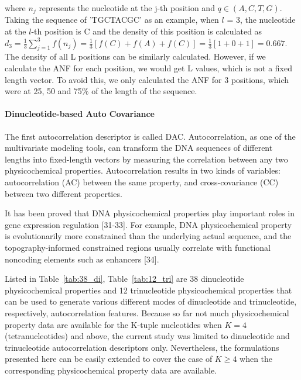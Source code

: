 where $n_{j}$ represents the nucleotide at the j-th position and $q \in (A,C,T,G)$. Taking the sequence of 'TGCTACGC' as an example, when $l$ = 3, the nucleotide at the $l$-th position is C and the density of this position is calculated as $d_{3} = \frac{1}{3}\sum_{j=1}^{3}f(n_{j}) = \frac{1}{3} [f(C) + f(A) + f(C)] = \frac{1}{3} [1+0+1] = 0.667$. The density of all L positions can be similarly calculated. However, if we calculate the ANF for each position, we would get L values, which is not a fixed length vector. To avoid this, we only calculated the ANF for 3 positions, which were at 25, 50 and 75\% of the length of the sequence.

\paragraph{Dinucleotide-based Auto Covariance}

The first autocorrelation descriptor is called \gls{DAC}. Autocorrelation, as one of the multivariate modeling tools, can transform the DNA sequences of different lengths into fixed-length vectors by measuring the correlation between any two physicochemical properties. Autocorrelation results in two kinds of variables: autocorrelation (AC) between the same property, and cross-covariance (CC) between two different properties.

It has been proved that DNA physicochemical properties play important roles in gene expression regulation [31-33]. For example, DNA physicochemical property is evolutionarily more constrained than the underlying actual sequence, and the topography-informed constrained regions usually correlate with functional noncoding elements such as enhancers [34].

Listed in Table~\ref{tab:38_di}, Table~\ref{tab:12_tri} are 38 dinucleotide physicochemical properties and 12 trinucleotide physicochemical properties that can be used to generate various different modes of dinucleotide and trinucleotide, respectively, autocorrelation features. Because so far not much physicochemical property data are available for the K-tuple nucleotides when $K = 4$ (tetranucleotides) and above, the current study was limited to dinucleotide and trinucleotide autocorrelation descriptors only. Nevertheless, the formulations presented here can be easily extended to cover the case of $K \geq 4$ when the corresponding physicochemical property data are available.


